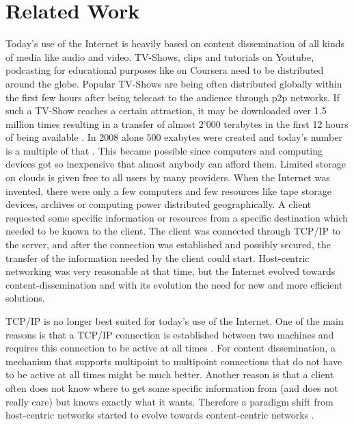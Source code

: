 \chapter{Related Work}

Today's use of the Internet is heavily based on content dissemination of all kinds of media like audio and video. TV-Shows, clips and tutorials on Youtube, podcasting for educational purposes like on Coursera need to be distributed around the globe. Popular TV-Shows are being often distributed globally within the first few hours after being telecast to the audience through p2p networks. If such a TV-Show reaches a certain attraction, it may be downloaded over 1.5 million times resulting in a transfer of almost 2'000 terabytes in the first 12 hours of being available \cite{forbes14}. In 2008 alone 500 exabytes were created and today's number is a multiple of that \cite{gantz07}. This became possible since computers and computing devices got so inexpensive that almost anybody can afford them. Limited storage on clouds is given free to all users by many providers. When the Internet was invented, there were only a few computers and few resources like tape storage devices, archives or computing power distributed geographically. A client requested some specific information or resources from a specific destination which needed to be known to the client. The client was connected through TCP/IP to the server, and after the connection was established and possibly secured, the transfer of the information needed by the client could start. Host-centric networking was very reasonable at that time, but the Internet evolved towards content-dissemination and with its evolution the need for new and more efficient solutions.

\vspace{5mm} %

TCP/IP is no longer best suited for today's use of the Internet. One of the main reasons is that a TCP/IP connection is established between two machines and requires this connection to be active at all times \cite{Ajunwadkar14}. For content dissemination, a mechanism that supports multipoint to multipoint connections that do not have to be active at all times might be much better. Another reason is that a client often does not know where to get some specific information from (and does not really care) but knows exactly what it wants. Therefore a paradigm shift from host-centric networks started to evolve towards content-centric networks \cite{ndn17}.

